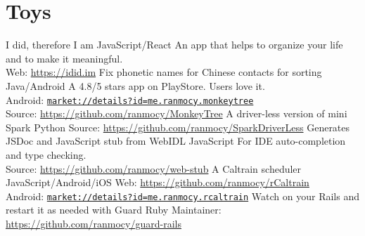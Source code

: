 \documentclass[]{friggeri-cv} %
\begin{document}

\section{Toys}

\begin{entrylist}
  {I did, therefore I am}
  {JavaScript/React}
  {
    An app that helps to organize your life and to make it meaningful.\\
    Web: \url{https://idid.im}
  }
  {Fix phonetic names for Chinese contacts for sorting}
  {Java/Android}
  {
    A 4.8/5 stars app on PlayStore. Users love it.\\
    Android: \href{https://play.google.com/store/apps/details?id=me.ranmocy.monkeytree}{\texttt{market://details?id=me.ranmocy.monkeytree}}\\
    Source: \url{https://github.com/ranmocy/MonkeyTree}
  }
  {A driver-less version of mini Spark}
  {Python}
  {
    Source: \url{https://github.com/ranmocy/SparkDriverLess}
  }
  {Generates JSDoc and JavaScript stub from WebIDL}
  {JavaScript}
  {
    For IDE auto-completion and type checking.\\
    Source: \url{https://github.com/ranmocy/web-stub}
  }
  {A Caltrain scheduler}
  {JavaScript/Android/iOS}
  {
    Web: \url{https://github.com/ranmocy/rCaltrain}\\
    Android: \href{https://play.google.com/store/apps/details?id=me.ranmocy.rcaltrain}{\texttt{market://details?id=me.ranmocy.rcaltrain}}
  }
  {Watch on your Rails and restart it as needed with Guard}
  {Ruby}
  {
    Maintainer: \url{https://github.com/ranmocy/guard-rails}
  }
\end{entrylist}

\end{document}

